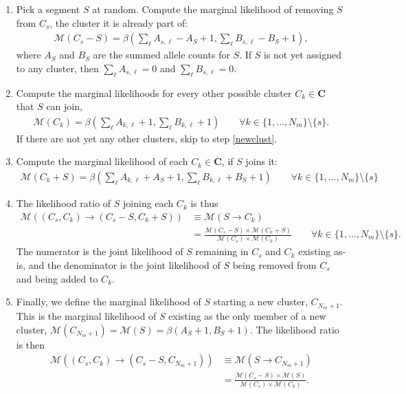 \documentclass[10pt,letter]{article}
\numberwithin{equation}{section}
\begin{document}
\begin{enumerate}
\item Pick a segment $S$ at random. Compute the marginal likelihood of removing $S$ from $C_s$, the cluster it is already part of:
\begin{align*}
\mathcal{M}(C_s-S) = \beta(\textstyle\sum_\ell A_{s,\ell} - A_S + 1, \textstyle\sum_\ell B_{s,\ell} - B_S + 1),
\end{align*}
where $A_S$ and $B_S$ are the summed allele counts for $S$. If $S$ is not yet assigned to any cluster, then $\sum_\ell A_{s,\ell} = 0$ and $\sum_\ell B_{s,\ell} = 0$.
\item Compute the marginal likelihoods for every other possible cluster $C_k\in\mathbf{C}$ that $S$ can join,
\begin{align*}
\mathcal{M}(C_k) = \beta(\textstyle\sum_\ell A_{k,\ell} + 1, \textstyle\sum_\ell B_{k,\ell} + 1)\qquad \forall k\in\{1,\dots,N_m\}\setminus\{s\}.
\end{align*}
If there are not yet any other clusters, skip to step \ref{newclust}.
\item Compute the marginal likelihood of each $C_k\in\mathbf{C}$, if $S$ joins it:
\begin{align*}
\mathcal{M}(C_k+S) = \beta(\textstyle\sum_\ell A_{k,\ell} + A_S + 1, \textstyle\sum_\ell B_{k,\ell} + B_S + 1)\qquad \forall k\in\{1,\dots,N_m\}\setminus\{s\}
\end{align*}
\item The likelihood ratio of $S$ joining each $C_k$ is thus
\begin{align*}
\mathcal{M}((C_s,C_k)\to (C_s-S,C_k+S)) &\equiv\mathcal{M}(S\to C_k)\\
&= \frac{\mathcal{M}(C_s-S)\times\mathcal{M}(C_k+S)}{\mathcal{M}(C_s)\times\mathcal{M}(C_k)}\qquad \forall k\in\{1,\dots,N_m\}\setminus\{s\}.
\end{align*}
The numerator is the joint likelihood of $S$ remaining in $C_s$ and $C_k$ existing as-is, and the denominator is the joint likelihood of $S$ being removed from $C_s$ and being added to $C_k$.
\item \label{newclust} Finally, we define the marginal likelihood of $S$ starting a new cluster, $C_{N_m+1}$. This is the marginal likelihood of $S$ existing as the only member of a new cluster, $\mathcal{M}(C_{N_m+1}) = \mathcal{M}(S) = \beta(A_S+1,B_S+1)$. The likelihood ratio is then
\begin{align*}
\mathcal{M}((C_s,C_k)\to (C_s-S,C_{N_m+1})) &\equiv\mathcal{M}(S\to C_{N_m+1})\\
&= \frac{\mathcal{M}(C_s-S)\times\mathcal{M}(S)}{\mathcal{M}(C_s)\times\mathcal{M}(C_k)}.
\end{align*}
\end{enumerate}
\end{document}
